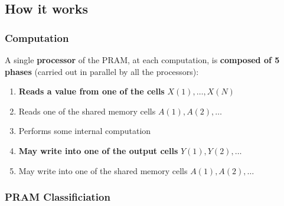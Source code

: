 \subsection{How it works}

\subsubsection{Computation}

A single \textbf{processor} of the PRAM, at each computation, is \textbf{composed of 5 phases} (carried out in parallel by all the processors):
\begin{enumerate}
    \item \textbf{Reads a value from one of the cells} $X\left(1\right), \dots, X\left(N\right)$
    \item Reads one of the shared memory cells $A\left(1\right), A\left(2\right), \dots$
    \item Performs some internal computation
    \item \textbf{May write into one of the output cells} $Y\left(1\right), Y\left(2\right), \dots$
    \item May write into one of the shared memory cells $A\left(1\right), A\left(2\right), \dots$
\end{enumerate}

\longline

\subsubsection{PRAM Classificiation}


